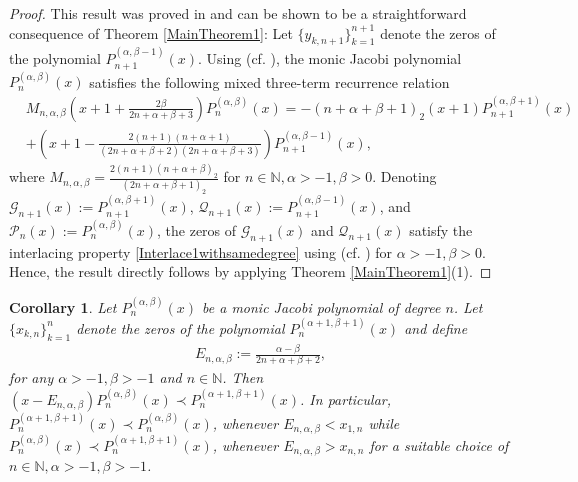 \documentclass[final,3p,times,12pt]{elsarticle}
\newtheorem{corollary}{Corollary}[section]
\newtheorem{remark}{Remark}[section]
\numberwithin{equation}{section}  %
\begin{document}
\begin{proof} This result was proved in \cite[Theorem 1]{Arvesu-Driver-Littlejohn-RamanujanJ-2023} and can be shown to be a straightforward consequence of Theorem \ref{MainTheorem1}:
	Let  $\{y_{k,n+1}\}_{k=1}^{n+1}$ denote the zeros of the polynomial $P^{(\alpha, \beta-1)}_{n+1}(x)$. Using (cf. \cite[eq.~(4)]{Arvesu-Driver-Littlejohn-RamanujanJ-2023}), the monic Jacobi polynomial $P^{(\alpha,\beta)}_n(x)$ satisfies the following mixed three-term recurrence relation
	\begin{align}
		\nonumber	&M_{n,\alpha,\beta}\left(x+1+\frac{2 \beta}{2n+\alpha+\beta+3}\right)P^{(\alpha, \beta)}_{n}(x)=-(n+\alpha+\beta+1)_2(x+1)P^{(\alpha, \beta+1)}_{n+1}(x)\\&+\left(x+1 - \frac{2(n+1)(n+\alpha+1)}{(2n+\alpha+\beta+2)(2n+\alpha+\beta+3)}\right)P^{(\alpha, \beta-1)}_{n+1}(x),
	\end{align}
	where $M_{n,\alpha,\beta}=\frac{2(n+1)(n+\alpha+\beta)_2}{(2n+\alpha+\beta+1)_2}$ for $n\in \mathbb{N}, \alpha>-1, \beta>0$. Denoting $\mathcal{G}_{n+1}(x):=P^{(\alpha, \beta+1)}_{n+1}(x)$, $\mathcal{Q}_{n+1}(x):=P^{(\alpha, \beta-1)}_{n+1}(x)$, and $\mathcal{P}_n(x):=P^{(\alpha, \beta)}_{n}(x)$, the zeros of $\mathcal{G}_{n+1}(x)$ and $\mathcal{Q}_{n+1}(x)$ satisfy the interlacing property \eqref{Interlace1withsamedegree} using (cf. \cite[Theorem 2.4]{Driver-Jordaan-Mbuyi-NumericalAlg-2008}) for $\alpha>-1,\beta>0$. Hence, the result directly follows by applying Theorem \ref{MainTheorem1}(1).\end{proof}
	

\begin{corollary}\label{interlaceJacobi-n_ab-n+1_a+1b+1*}
	Let $P^{(\alpha, \beta)}_n(x)$ be a monic Jacobi  polynomial of degree $n$. Let $\{x_{k,n}\}_{k=1}^{n}$ denote the zeros of the polynomial $P^{(\alpha+1, \beta+1)}_{n}(x)$
    and define  \begin{align}
		E_{n,\alpha,\beta}:=  \frac{\alpha-\beta}{2n+\alpha+\beta+2},
	\end{align} for any $\alpha>-1, \beta >-1$ and $n\in \mathbb{N}$. Then $(x-E_{n,\alpha,\beta})P^{(\alpha, \beta)}_n(x)\prec P^{(\alpha+1, \beta+1)}_{n}(x)$. In particular, $P^{(\alpha+1,\beta+1)}_{n}(x)\prec P^{(\alpha, \beta)}_n(x)$, whenever $E_{n,\alpha,\beta}<x_{1,n}$ while  $P^{(\alpha, \beta)}_n(x) \prec P^{(\alpha+1,\beta+1)}_{n}(x)$, whenever $E_{n,\alpha,\beta}>x_{n,n}$ for a suitable choice of $n\in \mathbb{N}, \alpha>-1, \beta>-1$.
\end{corollary} 
\end{document}
